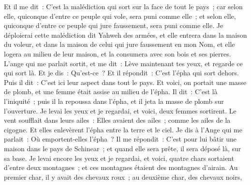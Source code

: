 \begin{multicols}{2}
Et il me dit~: C'est la malédiction qui sort sur la face de tout le pays~; car selon elle, quiconque d'entre ce peuple qui vole, sera puni comme elle~; et selon elle, quiconque d'entre ce peuple qui jure faussement, sera puni comme elle.
Je déploierai cette malédiction dit Yahweh des armées, et elle entrera dans la maison du voleur, et dans la maison de celui qui jure faussement en mon Nom, et elle logera au milieu de leur maison, et la consumera avec son bois et ses pierres.
L'ange qui me parlait sortit, et me dit~: Lève maintenant tes yeux, et regarde ce qui sort là.
Et je dis~: Qu'est-ce~? Et il répondit~: C'est l'épha qui sort dehors. Puis il dit~: C'est ici leur aspect dans tout le pays.
Et voici, on portait une masse de plomb, et une femme était assise au milieu de l'épha.
Il dit~: C'est là l'iniquité~; puis il la repoussa dans l'épha, et il jeta la masse de plomb sur l'ouverture.
Je levai les yeux et je regardai, et voici, deux femmes sortirent. Le vent soufflait dans leurs ailes~: Elles avaient des ailes~; comme les ailes de la cigogne. Et elles enlevèrent l'épha entre la terre et le ciel.
Je dis à l'Ange qui me parlait~: Où emportent-elles l'épha~?
Il me répondit~: C'est pour lui bâtir une maison dans le pays de Schinear~; et quand elle sera prête, il sera déposé là, sur sa base.
\VerseOne{}Je levai encore les yeux et je regardai, et voici, quatre chars sortaient d'entre deux montagnes~; et ces montagnes étaient des montagnes d'airain.
Au premier char, il y avait des chevaux roux~; au deuxième char, des chevaux noirs,

\end{multicols}
